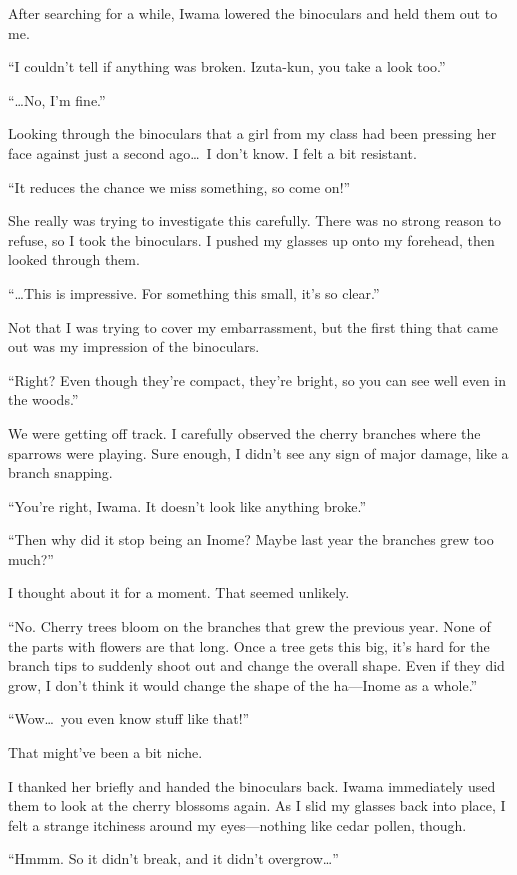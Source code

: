 \documentclass[
    a4paper,
    12pt,
    twoside,
    openany,
    UTF8,
    fontset=windows
]{ctexbook}
\begin{document}
After searching for a while, Iwama lowered the binoculars and held them out to me.

``I couldn't tell if anything was broken. Izuta-kun, you take a look too.''

``\dots No, I'm fine.''

Looking through the binoculars that a girl from my class had been pressing her face against just a second ago\dots\ I don't know. I felt a bit resistant.

``It reduces the chance we miss something, so come on!''

She really was trying to investigate this carefully. There was no strong reason to refuse, so I took the binoculars. I pushed my glasses up onto my forehead, then looked through them.

``\dots This is impressive. For something this small, it's so clear.''

Not that I was trying to cover my embarrassment, but the first thing that came out was my impression of the binoculars.

``Right? Even though they're compact, they're bright, so you can see well even in the woods.''

We were getting off track. I carefully observed the cherry branches where the sparrows were playing. Sure enough, I didn't see any sign of major damage, like a branch snapping.

``You're right, Iwama. It doesn't look like anything broke.''

``Then why did it stop being an Inome? Maybe last year the branches grew too much?''

I thought about it for a moment. That seemed unlikely.

``No. Cherry trees bloom on the branches that grew the previous year. None of the parts with flowers are that long. Once a tree gets this big, it's hard for the branch tips to suddenly shoot out and change the overall shape. Even if they did grow, I don't think it would change the shape of the ha---Inome as a whole.''

``Wow\dots\ you even know stuff like that!''

That might've been a bit niche.

I thanked her briefly and handed the binoculars back. Iwama immediately used them to look at the cherry blossoms again. As I slid my glasses back into place, I felt a strange itchiness around my eyes---nothing like cedar pollen, though.

``Hmmm. So it didn't break, and it didn't overgrow\dots''
\end{document}
